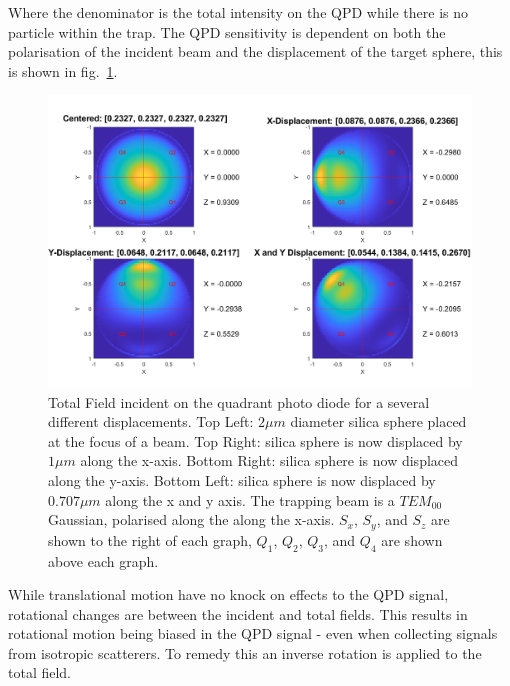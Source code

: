 Where the denominator is the total intensity on the QPD while there is 
no particle within the trap. The QPD sensitivity is dependent on both 
the polarisation of the incident beam and the displacement of the target 
sphere, this is shown in fig.~\ref{fig:totalfield}.
\begin{figure}[h!]
	\centering
	\includegraphics[width=0.7\linewidth]{fixed_polarisation.png}
	\caption{Total Field incident on the quadrant photo diode for a several
		different displacements. Top Left: $2\mu m$ diameter silica sphere
		placed at the focus of a  beam. Top Right: silica sphere is now
		displaced by $1 \mu m$ along the x-axis. Bottom Right: silica sphere 
		is now displaced along the y-axis. Bottom Left: silica sphere is 
		now displaced by $0.707 \mu m$ along the x and y axis. The 
		trapping beam is a $TEM_{00}$ Gaussian, polarised along the along 
		the x-axis. $S_x$, $S_y$, and $S_z$ are shown to the right of each graph, $Q_1$, $Q_2$, $Q_3$, and $Q_4$ are shown above each graph.}
	\label{fig:totalfield}
\end{figure}

While translational motion have no knock on effects to the QPD signal, 
rotational changes are between the incident and total fields. This results
in rotational motion being biased in the QPD signal - even when collecting
signals from isotropic scatterers. To remedy this an inverse rotation is
applied to the total field. 

